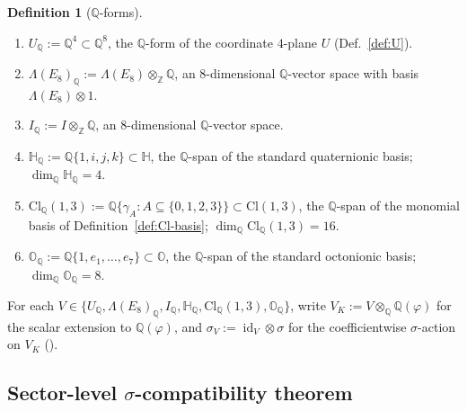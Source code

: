 \documentclass[11pt, a4paper]{amsart}
\theoremstyle{definition}
\newtheorem{definition}[theorem]{Definition}
\newcommand{\Q}{\mathbb{Q}}
\newcommand{\Z}{\mathbb{Z}}
\newcommand{\HH}{\mathbb{H}}
\newcommand{\OO}{\mathbb{O}}
\newcommand{\id}{\operatorname{id}}
\newcommand{\Cl}{\mathrm{Cl}}
\begin{document}
\begin{definition}[$\Q$-forms]
\label{def:Q-forms}
\hspace{0pt}
\begin{enumerate}
\item $U_\Q := \Q^4 \subset \Q^8$, the $\Q$-form of the coordinate
  $4$-plane $U$ (Def.~\ref{def:U}).
\item $\Lambda(E_8)_\Q := \Lambda(E_8) \otimes_\Z \Q$, an
  $8$-dimensional $\Q$-vector space with basis $\Lambda(E_8)
  \otimes 1$.
\item $I_\Q := I \otimes_\Z \Q$, an $8$-dimensional $\Q$-vector
  space.
\item $\HH_\Q := \Q\{1, i, j, k\} \subset \HH$, the $\Q$-span of
  the standard quaternionic basis; $\dim_\Q \HH_\Q = 4$.
\item $\Cl_\Q(1, 3) := \Q\{\gamma_A : A \subseteq \{0,1,2,3\}\}
  \subset \Cl(1,3)$, the $\Q$-span of the monomial basis of
  Definition~\ref{def:Cl-basis}; $\dim_\Q \Cl_\Q(1,3) = 16$.
\item $\OO_\Q := \Q\{1, e_1, \ldots, e_7\} \subset \OO$, the
  $\Q$-span of the standard octonionic basis; $\dim_\Q \OO_\Q = 8$.
\end{enumerate}
For each $V \in \{U_\Q, \Lambda(E_8)_\Q, I_\Q, \HH_\Q, \Cl_\Q(1,3),
\OO_\Q\}$, write $V_K := V \otimes_\Q \Q(\varphi)$ for the scalar
extension to $\Q(\varphi)$, and $\sigma_V := \id_V \otimes \sigma$
for the coefficientwise $\sigma$-action on $V_K$
(\cite[Def.~2.5]{SigmaRationality}).
\end{definition}

\subsection{Sector-level $\sigma$-compatibility theorem}
\end{document}
